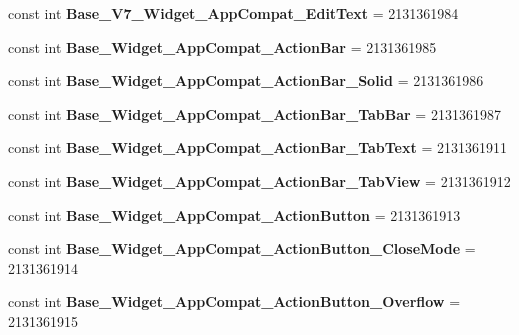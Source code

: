 \begin{DoxyCompactItemize}
const int {\bfseries Base\+\_\+\+V7\+\_\+\+Widget\+\_\+\+App\+Compat\+\_\+\+Edit\+Text} = 2131361984
\item 
\mbox{\label{classXaria_1_1Resource_1_1Style_a2a6500d122e085d2aba808dcbfd41670}} 
const int {\bfseries Base\+\_\+\+Widget\+\_\+\+App\+Compat\+\_\+\+Action\+Bar} = 2131361985
\item 
\mbox{\label{classXaria_1_1Resource_1_1Style_a9dbf48199fcbb5972d5d65c2847544e0}} 
const int {\bfseries Base\+\_\+\+Widget\+\_\+\+App\+Compat\+\_\+\+Action\+Bar\+\_\+\+Solid} = 2131361986
\item 
\mbox{\label{classXaria_1_1Resource_1_1Style_ac97af5e3ca90179f9990596b1539afa7}} 
const int {\bfseries Base\+\_\+\+Widget\+\_\+\+App\+Compat\+\_\+\+Action\+Bar\+\_\+\+Tab\+Bar} = 2131361987
\item 
\mbox{\label{classXaria_1_1Resource_1_1Style_a0eafaba12a7950e356daee328b89ddf4}} 
const int {\bfseries Base\+\_\+\+Widget\+\_\+\+App\+Compat\+\_\+\+Action\+Bar\+\_\+\+Tab\+Text} = 2131361911
\item 
\mbox{\label{classXaria_1_1Resource_1_1Style_a1ccf1ae8a0bbe496e2f226c63841000c}} 
const int {\bfseries Base\+\_\+\+Widget\+\_\+\+App\+Compat\+\_\+\+Action\+Bar\+\_\+\+Tab\+View} = 2131361912
\item 
\mbox{\label{classXaria_1_1Resource_1_1Style_a04491950d2000a500111668d423e2064}} 
const int {\bfseries Base\+\_\+\+Widget\+\_\+\+App\+Compat\+\_\+\+Action\+Button} = 2131361913
\item 
\mbox{\label{classXaria_1_1Resource_1_1Style_aba4f6aaa0a49fe6bcf37f58c89f51740}} 
const int {\bfseries Base\+\_\+\+Widget\+\_\+\+App\+Compat\+\_\+\+Action\+Button\+\_\+\+Close\+Mode} = 2131361914
\item 
\mbox{\label{classXaria_1_1Resource_1_1Style_afdb12970ad4f8523e23950745759e8ee}} 
const int {\bfseries Base\+\_\+\+Widget\+\_\+\+App\+Compat\+\_\+\+Action\+Button\+\_\+\+Overflow} = 2131361915

\end{DoxyCompactItemize}
